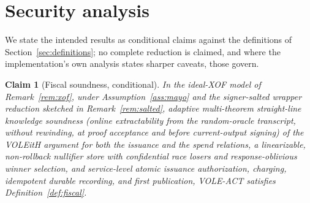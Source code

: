 \documentclass[11pt]{article}
\newtheorem{claim}{Claim}
\begin{document}
\section{Security analysis}
\label{sec:security}

We state the intended results as conditional claims against the definitions
of Section~\ref{sec:definitions}; no complete reduction is claimed, and
where the implementation's own analysis states sharper caveats, those
govern.

\begin{claim}[Fiscal soundness, conditional]
\label{claim:fiscal}
In the ideal-XOF model of Remark~\ref{rem:xof}, under
Assumption~\ref{ass:mayo} and the signer-salted wrapper reduction sketched in
Remark~\ref{rem:salted}, adaptive multi-theorem \emph{straight-line}
knowledge soundness (online extractability from the random-oracle
transcript, without rewinding, at proof acceptance and before current-output
signing) of the VOLEitH argument for \emph{both}
the issuance and the spend relations, a linearizable, non-rollback nullifier
store with confidential race losers and response-oblivious winner selection,
and service-level atomic issuance authorization, charging, idempotent durable
recording, and first publication, VOLE-ACT satisfies
Definition~\ref{def:fiscal}.
\end{claim}
\end{document}
